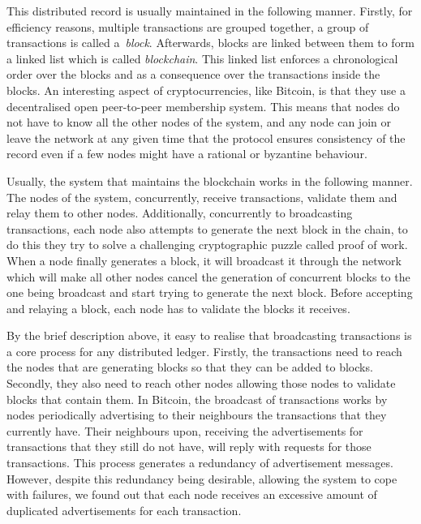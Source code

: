 \documentclass{dads}   %
\begin{document}
This distributed record is usually maintained in the following manner.  Firstly, for efficiency reasons, multiple transactions are grouped together, a group of transactions is called a~\textsl{block}. Afterwards, blocks are linked between them to form a linked list which is called \textit{blockchain}. This linked list enforces a chronological order over the blocks and as a consequence over the transactions inside the blocks. An interesting aspect of cryptocurrencies, like Bitcoin, is that they use a decentralised open peer-to-peer membership system. This means that nodes do not have to know all the other nodes of the system, and any node can join or leave the network at any given time that the protocol ensures consistency of the record even if a few nodes might have a rational or byzantine behaviour.

Usually, the system that maintains the blockchain works in the following manner. The nodes of the system, concurrently, receive transactions, validate them and relay them to other nodes. Additionally, concurrently to broadcasting transactions, each node also attempts to generate the next block in the chain, to do this they try to solve a challenging cryptographic puzzle called proof of work. When a node finally generates a block, it will broadcast it through the network which will make all other nodes cancel the generation of concurrent blocks to the one being broadcast and start trying to generate the next block. Before accepting and relaying a block, each node has to validate the blocks it receives.

By the brief description above, it easy to realise that broadcasting transactions is a core process for any distributed ledger. Firstly, the transactions need to reach the nodes that are generating blocks so that they can be added to blocks. Secondly, they also need to reach other nodes allowing those nodes to validate blocks that contain them. In Bitcoin, the broadcast of transactions works by nodes periodically advertising to their neighbours the transactions that they currently have. Their neighbours upon, receiving the advertisements for transactions that they still do not have, will reply with requests for those transactions. This process generates a redundancy of advertisement messages. However, despite this redundancy being desirable, allowing the system to cope with failures, we found out that each node receives an excessive amount of duplicated advertisements for each transaction.
\end{document}
